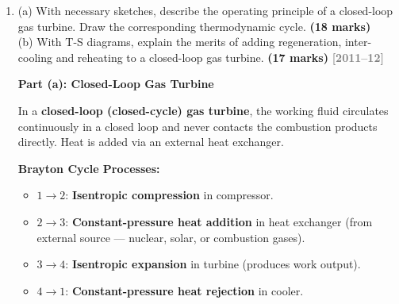 \documentclass[12pt,a3paper]{article}
\newcommand{\yr}[1]{\hfill\textcolor{gray}{\small\textbf{[#1]}}}
\newcommand{\mk}[1]{\textcolor{orange!70!black}{\small\textbf{(#1 marks)}}}
\begin{document}
\begin{enumerate}
\begin{tcolorbox}[enhanced,breakable,ansbox,colback=cB!4,colframe=cB,
  boxrule=0.8pt,arc=5pt,
  title={\textbf{Answer}},fonttitle=\bfseries\color{white},colbacktitle=cB]
\begin{center}
\end{center}


Key differences: actual cycle has \emph{rounded corners} (finite combustion
duration), \emph{lower peak pressure} (heat losses, incomplete combustion),
\emph{valve throttling losses} on intake/exhaust, and \emph{blowdown} before BDC.

\end{tcolorbox}

\item \label{qlabel:A2-Q18}
(a) With necessary sketches, describe the operating principle of a closed-loop gas turbine. Draw the corresponding thermodynamic cycle. \mk{18}\\
(b) With T-S diagrams, explain the merits of adding regeneration, inter-cooling and reheating to a closed-loop gas turbine. \mk{17}
\yr{2011--12}

\begin{tcolorbox}[enhanced,breakable,ansbox,colback=cB!4,colframe=cB,
  boxrule=0.8pt,arc=5pt,
  title={\textbf{Answer}},fonttitle=\bfseries\color{white},colbacktitle=cB]

\textbf{Part (a): Closed-Loop Gas Turbine}

In a \textbf{closed-loop (closed-cycle) gas turbine}, the working fluid
circulates continuously in a closed loop and never contacts the combustion
products directly. Heat is added via an external heat exchanger.

\textbf{Brayton Cycle Processes:}
\begin{itemize}[leftmargin=1.5em,itemsep=2pt]
  \item $1\to2$: \textbf{Isentropic compression} in compressor.
  \item $2\to3$: \textbf{Constant-pressure heat addition} in heat exchanger
        (from external source — nuclear, solar, or combustion gases).
  \item $3\to4$: \textbf{Isentropic expansion} in turbine (produces work output).
  \item $4\to1$: \textbf{Constant-pressure heat rejection} in cooler.
\end{itemize}


\end{tcolorbox}
\end{enumerate}
\end{document}
